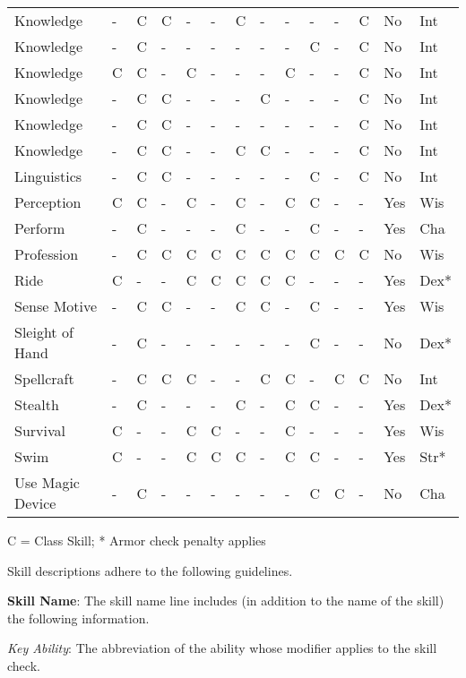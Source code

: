 \begin{table}[]
\begin{tabular}{llllllllllllll}
Knowledge & - & C & C & - & - & C & - & - & - & - & C & No & Int\\
Knowledge & - & C & - & - & - & - & - & - & C & - & C & No & Int\\
Knowledge & C & C & - & C & - & - & - & C & - & - & C & No & Int\\
Knowledge & - & C & C & - & - & - & C & - & - & - & C & No & Int\\
Knowledge & - & C & C & - & - & - & - & - & - & - & C & No & Int\\
Knowledge & - & C & C & - & - & C & C & - & - & - & C & No & Int\\
Linguistics & - & C & C & - & - & - & - & - & C & - & C & No & Int\\
Perception & C & C & - & C & - & C & - & C & C & - & - & Yes & Wis\\
Perform & - & C & - & - & - & C & - & - & C & - & - & Yes & Cha\\
Profession & - & C & C & C & C & C & C & C & C & C & C & No & Wis\\
Ride & C & - & - & C & C & C & C & C & - & - & - & Yes & Dex*\\
Sense Motive & - & C & C & - & - & C & C & - & C & - & - & Yes & Wis\\
Sleight of Hand & - & C & - & - & - & - & - & - & C & - & - & No & Dex*\\
Spellcraft & - & C & C & C & - & - & C & C & - & C & C & No & Int\\
Stealth & - & C & - & - & - & C & - & C & C & - & - & Yes & Dex*\\
Survival & C & - & - & C & C & - & - & C & - & - & - & Yes & Wis\\
Swim & C & - & - & C & C & C & - & C & C & - & - & Yes & Str*\\
Use Magic Device & - & C & - & - & - & - & - & - & C & C & - & No & Cha\\
\end{tabular}
 C = Class Skill; * Armor check penalty applies\\
\end{table}

				
Skill descriptions adhere to the following guidelines.
				
\textbf{Skill Name}: The skill name line includes (in addition to the name of the skill) the following information.
				
\textit{Key Ability}: The abbreviation of the ability whose modifier applies to the skill check.\newline
				
